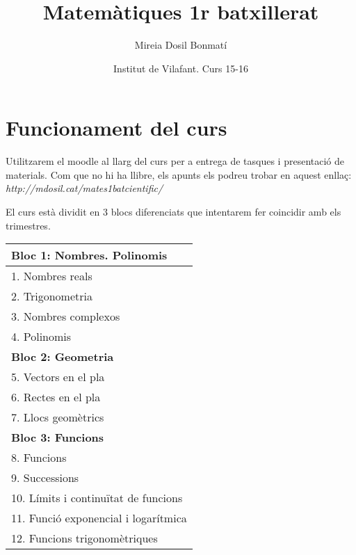 \documentclass{article}
\title{Matemàtiques 1r batxillerat}
\author{Mireia Dosil Bonmatí}
\author{Institut de Vilafant. Curs 15-16}
\newlength{\rulelength}
\begin{document}
\thispagestyle{empty}
\setlength{\unitlength}{1in}

\makeatletter
\vspace*{3ex}
\par\noindent{\hspace*{-1.5em}\LARGE\bf \@title}
\vspace*{-1.2ex}
\par\noindent{{\hspace*{-1.5em}\rule{\rulelength}{1.05pt}}}
\vspace*{-.5ex}
\par\noindent{\hspace*{-1.5em}\large \@author}
\vspace*{5ex}
\makeatother

\section{Funcionament del curs}

Utilitzarem el moodle al llarg del curs per a entrega de tasques i presentació de materials. Com que no hi ha llibre, els apunts els podreu trobar en aquest enllaç: \emph{http://mdosil.cat/mates1batcientific/}

El curs està dividit en 3 blocs diferenciats que intentarem fer coincidir amb els trimestres. 




\begin{center}
	\begin{tabular}{ | l |}
		\hline
		\textbf{Bloc 1: Nombres. Polinomis}   \\ 
		\hline
		1. Nombres reals \\
		2. Trigonometria\\
		3. Nombres complexos\\
		4. Polinomis\\
		\hline
		\hline
		\textbf{Bloc 2: Geometria}   \\ 
		\hline
		5. Vectors en el pla \\
		6. Rectes en el pla\\
		7. Llocs geomètrics\\
		\hline
		\hline
		\textbf{Bloc 3: Funcions}   \\ 
		\hline
		8. Funcions \\
		9. Successions\\
		10. Límits i continuïtat de funcions\\
		11. Funció exponencial i logarítmica\\
		12. Funcions trigonomètriques\\
		\hline
		
	\end{tabular}
\end{center}
\end{document}
